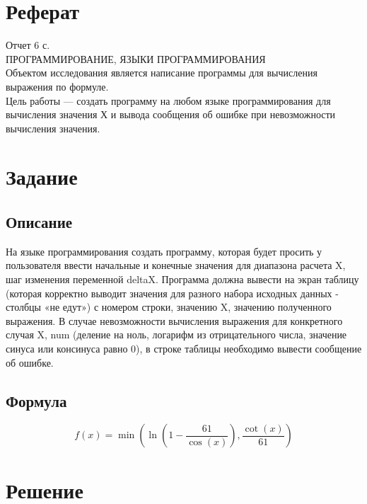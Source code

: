 \documentclass[a4paper,12pt,russian]{report}
\begin{document}


\newpage
{}
\setcounter{page}{2}

\tableofcontents

\section{Реферат}

Отчет 6 с. \\
ПРОГРАММИРОВАНИЕ, ЯЗЫКИ ПРОГРАММИРОВАНИЯ \\
Объектом исследования является написание программы для вычисления выражения по формуле. \\
Цель работы — создать программу на любом языке программирования для вычисления значения Х и вывода сообщения об ошибке при невозможности вычисления значения. \\

\section{Задание}

\subsection{Описание}
На языке программирования создать программу, которая будет просить у пользователя ввести начальные и конечные значения для диапазона расчета X, шаг изменения переменной deltaX. Программа должна вывести на экран таблицу (которая корректно выводит значения для разного набора исходных данных - столбцы «не едут») с номером строки, значению X, значению полученного выражения. В случае невозможности вычисления выражения для конкретного случая X, num (деление на ноль, логарифм из отрицательного числа, значение синуса или консинуса равно 0), в строке таблицы необходимо вывести сообщение об ошибке.

\subsection{Формула}
\begin{equation*}
  f(x) = \min\left(\ln\left(1-\frac{61}{\cos(x)}\right), \frac{\cot(x)}{61}\right)
\end{equation*}
\clearpage

\section{Решение}
\end{document}
